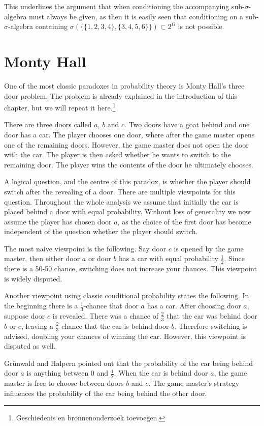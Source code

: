 \documentclass[a4paper]{report}
\theoremstyle{plain}
\theoremstyle{definition}
\theoremstyle{remark}
\numberwithin{equation}{chapter}
\DeclareMathOperator{\1}{\mathbbm{1}}
\begin{document}
This underlines the argument that when conditioning the accompanying sub-$\sigma$-algebra must always be given, as then it is easily seen that conditioning on a sub-$\sigma$-algebra containing $\sigma(\{\{1,2,3,4\},\{3,4,5,6\}\})\subset2^\Omega$ is not possible.

\section{Monty Hall}\label{sec:DiscMonty}
One of the most classic paradoxes in probability theory is Monty Hall's three door problem. The problem is already explained in the introduction of this chapter, but we will repeat it here.\footnote{Geschiedenis en bronnenonderzoek toevoegen.}

There are three doors called $a$, $b$ and $c$.  Two doors have a goat behind and one door has a car. The player chooses one door, where after the game master opens one of the remaining doors. However, the game master does not open the door with the car. The player is then asked whether he wants to switch to the remaining door. The player wins the contents of the door he ultimately chooses.

A logical question, and the centre of this paradox, is whether the player should switch after the revealing of a door. There are multiple viewpoints for this question. Throughout the whole analysis we assume that initially the car is placed behind a door with equal probability. Without loss of generality we now assume the player has chosen door $a$, as the choice of the first door has become independent of the question whether the player should switch. 

The most naive viewpoint is the following. Say door $c$ is opened by the game master, then either door $a$ or door $b$ has a car with equal probability $\frac{1}{2}$. Since there is a 50-50 chance, switching does not increase your chances. This viewpoint is widely disputed.

Another viewpoint using classic conditional probability states the following. In the beginning there is a $\frac{1}{3}$-chance that door $a$ has a car. After choosing door $a$, suppose door $c$ is revealed. There was a chance of $\frac{2}{3}$ that the car was behind door $b$ or $c$, leaving a $\frac{2}{3}$-chance that the car is behind door $b$. Therefore switching is advised, doubling your chances of winning the car. However, this viewpoint is disputed as well.

Grünwald and Halpern \cite{Grunwald03} pointed out that the probability of the car being behind door $a$ is anything between $0$ and $\frac{1}{2}$. When the car is behind door $a$, the game master is free to choose between doors $b$ and $c$. The game master's strategy influences the probability of the car being behind the other door.
\end{document}
